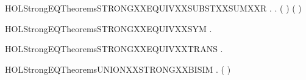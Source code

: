 \newcommand{\HOLStrongEQTheoremsSTRONGXXEQUIVXXSUBSTXXSUMXXL}{\UseVerbatim{HOLStrongEQTheoremsSTRONGXXEQUIVXXSUBSTXXSUMXXL}}
\begin{SaveVerbatim}{HOLStrongEQTheoremsSTRONGXXEQUIVXXSUBSTXXSUMXXR}
\HOLTokenTurnstile{} \HOLSymConst{\HOLTokenForall{}} .
          \HOLSymConst{\HOLTokenImp{}}
       \HOLSymConst{\HOLTokenForall{}}.  ( \HOLSymConst{\ensuremath{+}} ) ( \HOLSymConst{\ensuremath{+}} )
\end{SaveVerbatim}
\newcommand{\HOLStrongEQTheoremsSTRONGXXEQUIVXXSUBSTXXSUMXXR}{\UseVerbatim{HOLStrongEQTheoremsSTRONGXXEQUIVXXSUBSTXXSUMXXR}}
\begin{SaveVerbatim}{HOLStrongEQTheoremsSTRONGXXEQUIVXXSYM}
\HOLTokenTurnstile{} \HOLSymConst{\HOLTokenForall{}} .    \HOLSymConst{\HOLTokenImp{}}   
\end{SaveVerbatim}
\newcommand{\HOLStrongEQTheoremsSTRONGXXEQUIVXXSYM}{\UseVerbatim{HOLStrongEQTheoremsSTRONGXXEQUIVXXSYM}}
\begin{SaveVerbatim}{HOLStrongEQTheoremsSTRONGXXEQUIVXXTRANS}
\HOLTokenTurnstile{} \HOLSymConst{\HOLTokenForall{}}  .
          \HOLSymConst{\HOLTokenConj{}}    \HOLSymConst{\HOLTokenImp{}}
         
\end{SaveVerbatim}
\newcommand{\HOLStrongEQTheoremsSTRONGXXEQUIVXXTRANS}{\UseVerbatim{HOLStrongEQTheoremsSTRONGXXEQUIVXXTRANS}}
\begin{SaveVerbatim}{HOLStrongEQTheoremsUNIONXXSTRONGXXBISIM}
\HOLTokenTurnstile{} \HOLSymConst{\HOLTokenForall{}} .
         \HOLSymConst{\HOLTokenConj{}}   \HOLSymConst{\HOLTokenImp{}}
        (  )
\end{SaveVerbatim}
